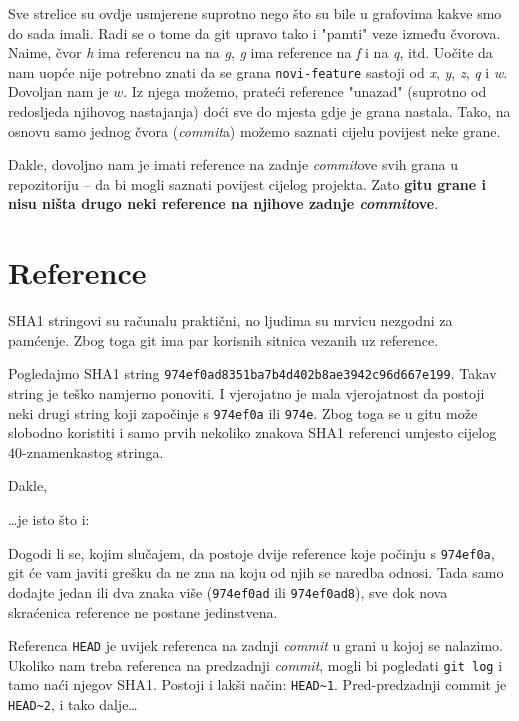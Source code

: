 Sve strelice su ovdje usmjerene suprotno nego što su bile u grafovima kakve smo do sada imali.
Radi se o tome da git upravo tako i "pamti" veze između čvorova.
Naime, čvor \emph h ima referencu na na \emph g, \emph g ima reference na \emph f i na \emph q, itd.
Uočite da nam uopće nije potrebno znati da se grana \verb+novi-feature+ sastoji od \emph x, \emph y, \emph z, \emph q i \emph w.
Dovoljan nam je $w$.
Iz njega možemo, prateći reference "unazad" (suprotno od redosljeda njihovog nastajanja) doći sve do mjesta gdje je grana nastala.
Tako, na osnovu samo jednog čvora (\emph{commit}a) možemo saznati cijelu povijest neke grane.

Dakle, dovoljno nam je imati reference na zadnje \emph{commit}ove svih grana u repozitoriju -- da bi mogli saznati povijest cijelog projekta.
Zato \textbf{gitu grane i nisu ništa drugo neki reference na njihove zadnje \emph{commit}ove}.

\section*{Reference}

SHA1 stringovi su računalu praktični, no ljudima su mrvicu nezgodni za pamćenje.
Zbog toga git ima par korisnih sitnica vezanih uz reference.

Pogledajmo SHA1 string \verb+974ef0ad8351ba7b4d402b8ae3942c96d667e199+.
Takav string je teško namjerno ponoviti. I vjerojatno je mala vjerojatnost da postoji neki drugi string koji započinje s \verb+974ef0a+ ili \verb+974e+.
Zbog toga se u gitu može slobodno koristiti i samo prvih nekoliko znakova SHA1 referenci umjesto cijelog $40$-znamenkastog stringa.

Dakle, 


\dots{}je isto što i:


Dogodi li se, kojim slučajem, da postoje dvije reference koje počinju s \verb+974ef0a+, git će vam javiti grešku da ne zna na koju od njih se naredba odnosi.
Tada samo dodajte jedan ili dva znaka više (\verb+974ef0ad+ ili \verb+974ef0ad8+), sve dok nova skraćenica reference ne postane jedinstvena.

Referenca \verb+HEAD+ je uvijek referenca na zadnji \emph{commit} u grani u kojoj se nalazimo.
Ukoliko nam treba referenca na predzadnji \emph{commit}, mogli bi pogledati \verb+git log+ i tamo naći njegov SHA1.
Postoji i lakši način: \verb+HEAD~1+.
Pred-predzadnji commit je \verb+HEAD~2+, i tako dalje\dots


